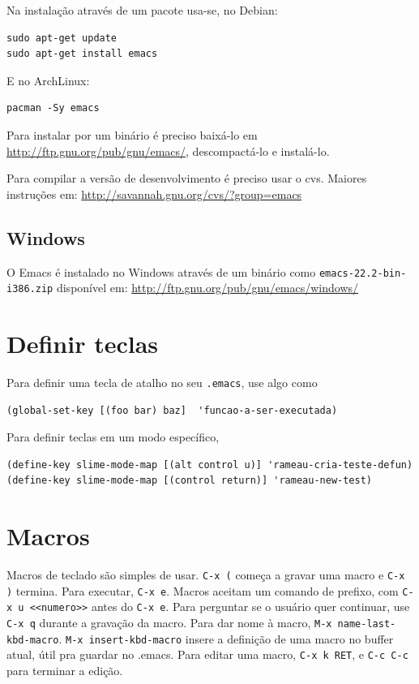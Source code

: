 \documentclass[12pt,brazil]{book}
\begin{document}
Na instalação através de um pacote usa-se, no Debian:

\begin{verbatim}
sudo apt-get update
sudo apt-get install emacs
\end{verbatim}

E no ArchLinux:

\begin{verbatim}
pacman -Sy emacs
\end{verbatim}

Para instalar por um binário é preciso baixá-lo em
\url{http://ftp.gnu.org/pub/gnu/emacs/}, descompactá-lo e instalá-lo.

Para compilar a versão de desenvolvimento é preciso usar o
cvs. Maiores instruções em:
\url{http://savannah.gnu.org/cvs/?group=emacs}

\subsection{Windows}
\label{sec:windows}

O Emacs é instalado no Windows através de um binário como
\texttt{emacs-22.2-bin-i386.zip} disponível em:
\url{http://ftp.gnu.org/pub/gnu/emacs/windows/}


\section{Definir teclas}
\label{sec:teclas}

Para definir uma tecla de atalho no seu \texttt{.emacs}, use algo como

\begin{verbatim}
(global-set-key [(foo bar) baz]  'funcao-a-ser-executada)
\end{verbatim}

Para definir teclas em um modo específico,

\begin{verbatim}
(define-key slime-mode-map [(alt control u)] 'rameau-cria-teste-defun)
(define-key slime-mode-map [(control return)] 'rameau-new-test)
\end{verbatim}

\section{Macros}
\label{sec:macros}

Macros de teclado são simples de usar. \texttt{C-x (} começa a gravar
uma macro e \texttt{C-x )} termina. Para executar, \texttt{C-x
  e}. Macros aceitam um comando de prefixo, com \texttt{C-x u
  <<numero>>} antes do \texttt{C-x e}. Para perguntar se o usuário
quer continuar, use \texttt{C-x q} durante a gravação da macro. Para
dar nome à macro, \texttt{M-x name-last-kbd-macro}. \texttt{M-x
  insert-kbd-macro} insere a definição de uma macro no buffer atual,
útil pra guardar no .emacs. Para editar uma macro, \texttt{C-x k RET},
e \texttt{C-c C-c} para terminar a edição.
\end{document}
